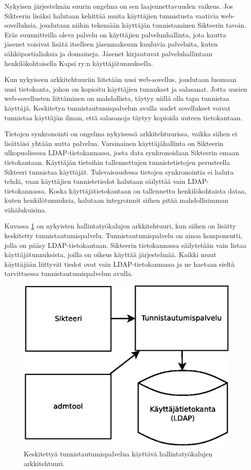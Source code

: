 Nykyisen järjestelmän suurin ongelma on sen laajennettavuuden vaikeus. Jos Sikteerin lisäksi halutaan kehittää muita käyttäjien tunnistusta vaativia web-sovelluksia, joudutaan niihin tekemään käyttäjän tunnistaminen Sikteerin tavoin. Eräs suunnitteilla oleva palvelu on käyttäjien palvelunhallinta, jota kautta jäsenet voisivat lisätä itselleen jäsenmaksuun kuuluvia palveluita, kuten sähköpostialiaksia ja domaineja. Jäsenet kirjautuvat palveluhallintaan henkilökohtaisella Kapsi ry:n käyttäjätunnuksella.

Kun nykyiseen arkkitehtuuriin liitetään uusi web-sovellus, joudutaan luomaan uusi tietokanta, johon on kopioitu käyttäjien tunnukset ja salasanat. Jotta uusien web-sovellusten liittäminen on mahdollista, täytyy niillä olla tapa tunnistaa käyttäjä. Keskitetyn tunnistautumispalvelun avulla uudet sovellukset voivat tunnistaa käyttäjän ilman, että salasanoja täytyy kopioida uuteen tietokantaan.

Tietojen synkronointi on ongelma nykyisessä arkkitehtuurissa, vaikka siihen ei lisättäisi yhtään uutta palvelua. Varsinainen käyttäjähallinta on Sikteerin ulkopuolisessa LDAP-tie\-to\-kan\-nas\-sa, josta data synkronoidaan Sikteerin omaan tietokantaan. Käyttäjän tietoihin tallennettujen tunnistetietojen perusteella Sikteeri tunnistaa käyttäjät. Tulevaisuudessa tietojen synkronointia ei haluta tehdä, vaan käyttäjien tunnistetiedot halutaan säilyttää vain LDAP-tietokannassa. Koska käyttäjätietokantaan on tallennettu henkilökohtaista dataa, kuten henkilötunnuksia, halutaan integroinnit siihen pitää mahdollisimman vähälukuisina.

Kuvassa \ref{kapsi_nykyinen_uusi} on nykyisten hallintatyökalujen arkkitehtuuri, kun siihen on lisätty keskitetty tunnistautumispalvelu. Tunnistautumispalvelu on ainoa komponentti, jolla on pääsy LDAP-tietokantaan. Sikteerin tietokannassa säilytetään vain listaa käyttäjätunnuksista, joilla on oikeus käyttää järjestelmää. Kaikki muut käyttäjään liittyvät tiedot ovat vain LDAP-tietokannassa ja ne haetaan sieltä tarvittaessa tunnistautumispalvelun avulla.

\begin{figure}[ht]
\centering
\includegraphics[width=.7\textwidth]{toteutus/muutostarve/kapsi_uusi.eps}
\caption{Keskitettyä tunnistautumispalvelua käyttävä hallintatyökalujen arkkitehtuuri.}%
\label{kapsi_nykyinen_uusi}
\end{figure}

